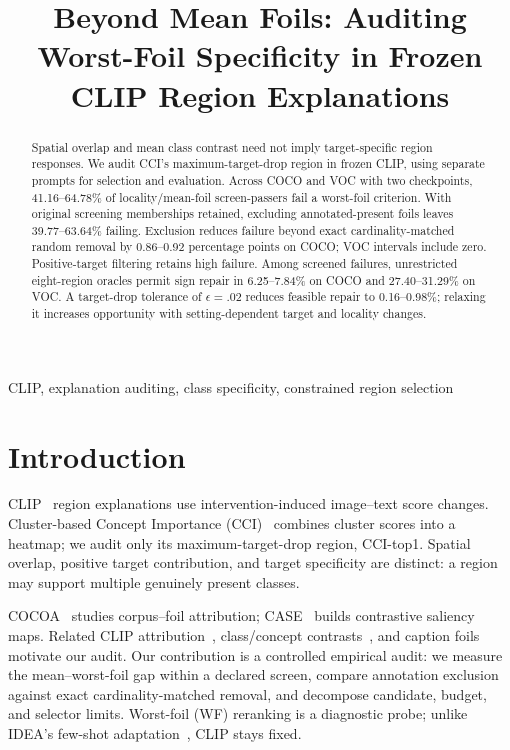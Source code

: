 \documentclass[10pt]{article}
\title{Beyond Mean Foils: Auditing Worst-Foil Specificity in Frozen CLIP Region Explanations}
\begin{document}
\maketitle
\begin{abstract}
Spatial overlap and mean class contrast need not imply target-specific region
responses. We audit CCI's maximum-target-drop region in frozen CLIP, using
separate prompts for selection and evaluation. Across COCO and VOC with two
checkpoints, 41.16--64.78\% of locality/mean-foil screen-passers fail a worst-foil
criterion. With original screening memberships retained, excluding annotated-present
foils leaves 39.77--63.64\% failing. Exclusion reduces failure beyond exact
cardinality-matched random removal by 0.86--0.92 percentage points on COCO;
VOC intervals include zero. Positive-target filtering retains high failure.
Among screened failures, unrestricted eight-region oracles permit sign repair
in 6.25--7.84\% on COCO and 27.40--31.29\% on VOC. A target-drop tolerance
of $\epsilon=.02$ reduces feasible repair to 0.16--0.98\%; relaxing it increases
opportunity with setting-dependent target and locality changes.
\end{abstract}
\begin{keywords}
CLIP, explanation auditing, class specificity, constrained region selection
\end{keywords}

\section{Introduction}
CLIP~\cite{radford2021clip} region explanations use intervention-induced
image--text score changes. Cluster-based Concept Importance
(CCI)~\cite{agarwal2025cci} combines cluster scores into a heatmap;
we audit only its maximum-target-drop region, CCI-top1. Spatial overlap,
positive target contribution, and target specificity are distinct:
a region may support multiple genuinely present classes.

COCOA~\cite{lin2023cocoa} studies corpus--foil attribution;
CASE~\cite{williamson2025case} builds contrastive saliency maps.
Related CLIP attribution~\cite{wang2023m2ib,li2023clipsurgery,dreyer2025cliplatent},
class/concept contrasts~\cite{li2026cdaclip,cheng2026mgaclip,visser2026contrastiveconcept},
and caption foils~\cite{yuksekgonul2023aro} motivate our audit.
Our contribution is a controlled empirical audit: we measure the
mean--worst-foil gap within a declared screen, compare annotation exclusion
against exact cardinality-matched removal, and decompose candidate, budget,
and selector limits. Worst-foil (WF) reranking is a diagnostic probe;
unlike IDEA's few-shot adaptation~\cite{ye2026idea}, CLIP stays fixed.
\end{document}
